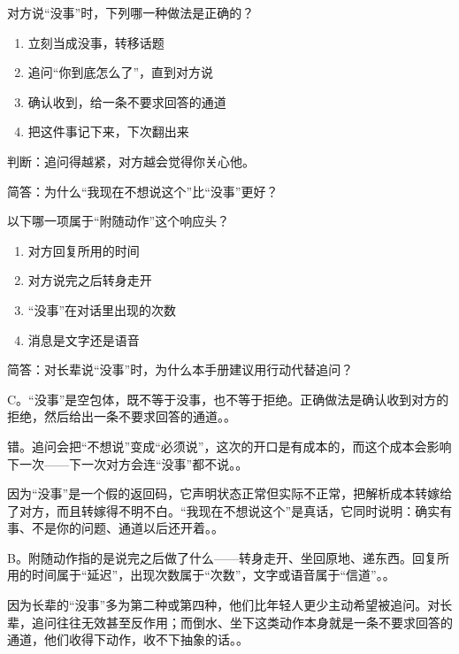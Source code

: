 \begin{quizsec}
\item 对方说“没事”时，下列哪一种做法是正确的？

\begin{enumerate}[label=\Alph*., leftmargin=2.2em, labelsep=0.6em,
                  itemsep=0.2em, topsep=0.3em, parsep=0.1em]
\item 立刻当成没事，转移话题
\item 追问“你到底怎么了”，直到对方说
\item 确认收到，给一条不要求回答的通道
\item 把这件事记下来，下次翻出来
\end{enumerate}

\item 判断：追问得越紧，对方越会觉得你关心他。

\item 简答：为什么“我现在不想说这个”比“没事”更好？

\item 以下哪一项属于“附随动作”这个响应头？

\begin{enumerate}[label=\Alph*., leftmargin=2.2em, labelsep=0.6em,
                  itemsep=0.2em, topsep=0.3em, parsep=0.1em]
\item 对方回复所用的时间
\item 对方说完之后转身走开
\item “没事”在对话里出现的次数
\item 消息是文字还是语音
\end{enumerate}

\item 简答：对长辈说“没事”时，为什么本手册建议用行动代替追问？
\end{quizsec}

\begin{answerssec}
\item C。“没事”是空包体，既不等于没事，也不等于拒绝。正确做法是确认收到对方的拒绝，然后给出一条不要求回答的通道。。

\item 错。追问会把“不想说”变成“必须说”，这次的开口是有成本的，而这个成本会影响下一次——下一次对方会连“没事”都不说。。

\item 因为“没事”是一个假的返回码，它声明状态正常但实际不正常，把解析成本转嫁给了对方，而且转嫁得不明不白。“我现在不想说这个”是真话，它同时说明：确实有事、不是你的问题、通道以后还开着。。

\item B。附随动作指的是说完之后做了什么——转身走开、坐回原地、递东西。回复所用的时间属于“延迟”，出现次数属于“次数”，文字或语音属于“信道”。。

\item 因为长辈的“没事”多为第二种或第四种，他们比年轻人更少主动希望被追问。对长辈，追问往往无效甚至反作用；而倒水、坐下这类动作本身就是一条不要求回答的通道，他们收得下动作，收不下抽象的话。。
\end{answerssec}

